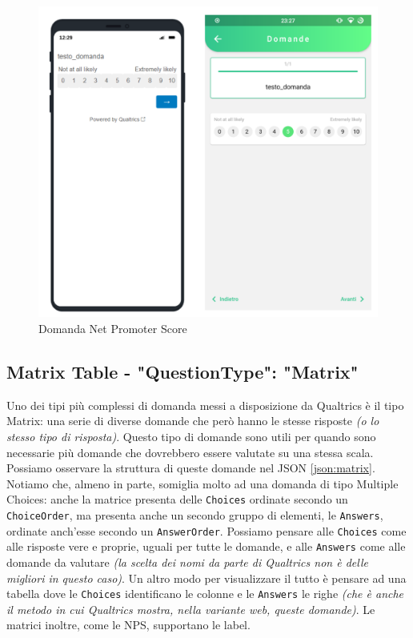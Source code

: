 \begin{figure}[h!]
\centering
\includegraphics[width=\textwidth]{img/nps}
\caption{Domanda Net Promoter Score}
\label{fig:nps}
\end{figure}

\clearpage
\subsection{Matrix Table - "QuestionType": "Matrix"}
Uno dei tipi più complessi di domanda messi a disposizione da Qualtrics è il tipo Matrix: una serie di diverse domande che però hanno le stesse risposte \textit{(o lo stesso tipo di risposta)}. Questo tipo di domande sono utili per quando sono necessarie più domande che dovrebbero essere valutate su una stessa scala. Possiamo osservare la struttura di queste domande nel JSON \ref{json:matrix}. Notiamo che, almeno in parte, somiglia molto ad una domanda di tipo Multiple Choices: anche la matrice presenta delle \texttt{Choices} ordinate secondo un \texttt{ChoiceOrder}, ma presenta anche un secondo gruppo di elementi, le \texttt{Answers}, ordinate anch'esse secondo un \texttt{AnswerOrder}.
Possiamo pensare alle \texttt{Choices} come alle risposte vere e proprie, uguali per tutte le domande, e alle \texttt{Answers} come alle domande da valutare \textit{(la scelta dei nomi da parte di Qualtrics non è delle migliori in questo caso)}. Un altro modo per visualizzare il tutto è pensare ad una tabella	dove le \texttt{Choices} identificano le colonne e le \texttt{Answers} le righe \textit{(che è anche il metodo in cui Qualtrics mostra, nella variante web, queste domande)}. Le matrici inoltre, come le NPS, supportano le label.

